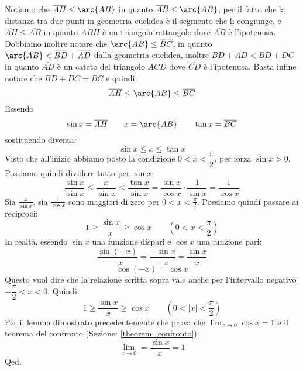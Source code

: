 {Notiamo che $\overline{AH} \leq \arc{AB}$ in quanto $\overline{AB} \leq \arc{AB}$, per il fatto che la distanza tra due punti in geometria euclidea è il segmento che li congiunge, e $\overline{AH} \leq \overline{AB}$ in quanto $ABH$ è un triangolo rettangolo dove $\overline{AB}$ è l'ipotenusa.\\

Dobbiamo inoltre notare che $\arc{AB} \leq \overline{BC}$, in quanto $\arc{AB} < \overline{BD} + \overline{AD}$ dalla geometria euclidea, inoltre $\overline{BD} + \overline{AD} < \overline{BD} + \overline{DC}$ in quanto $\overline{AD}$ è un cateto del triangolo $ACD$ dove $\overline{CD}$ è l'ipotenusa. Basta infine notare che $\overline{BD} + \overline{DC} = \overline{BC}$ e quindi:
\begin{equation*}
    \overline{AH} \leq \arc{AB} \leq \overline{BC}
\end{equation*}
Essendo
\begin{equation*}
    \sin{x} = \overline{AH} \qquad x = \arc{AB} \qquad \tan{x} = \overline{BC}
\end{equation*}
sostituendo diventa:
\begin{equation*}
    \sin{x} \leq x \leq \tan{x}
\end{equation*}
Visto che all'inizio abbiamo posto la condizione $0 < x < \dfrac{\pi}{2}$, per forza $\sin{x} > 0$. Possiamo quindi dividere tutto per $\sin{x}$:
\begin{equation*}
    \dfrac{\sin{x}}{\sin{x}} \leq \dfrac{x}{\sin{x}} \leq \dfrac{\tan{x}}{\sin{x}} = \dfrac{\sin{x}}{\cos{x}} \cdot \dfrac{1}{\sin{x}} = \dfrac{1}{\cos{x}}
\end{equation*}
Sia $\frac{x}{\sin{x}}$, sia $\frac{1}{\cos{x}}$ sono maggiori di zero per $0 < x < \frac{\pi}{2}$. Possiamo quindi passare ai reciproci:
\begin{equation*}
    1 \geq \dfrac{\sin{x}}{x} \geq \cos{x} \qquad \left( 0 < x < \dfrac{\pi}{2} \right)
\end{equation*}
In realtà, essendo $\sin{x}$ una funzione dispari e $\cos{x}$ una funzione pari:
\begin{equation*}
    \dfrac{\sin(-x)}{-x} = \dfrac{-\sin{x}}{-x} = \dfrac{\sin{x}}{x}
\end{equation*}
\begin{equation*}
    \cos(-x) = \cos x
\end{equation*}
Questo vuol dire che la relazione scritta sopra vale anche per l'intervallo negativo $-\dfrac{\pi}{2} < x < 0$. Quindi:
\begin{equation*}
    1 \geq \dfrac{\sin{x}}{x} \geq \cos{x} \qquad \left( 0 < |x| < \dfrac{\pi}{2} \right)
\end{equation*}
Per il lemma dimostrato precedentemente che prova che $\lim_{x \to 0} \cos{x} = 1$ e il teorema del confronto (Sezione: \ref{theorem_confronto}):
\begin{equation*}
    \lim_{x \to 0} = \dfrac{\sin{x}}{x} = 1
\end{equation*}
\hfill Qed.
}
